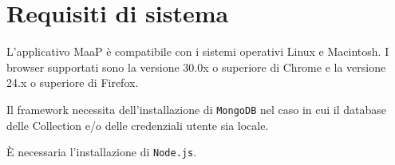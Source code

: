 \section{Requisiti di sistema}

L'applicativo MaaP è compatibile con i sistemi operativi Linux e Macintosh.
I browser supportati sono la versione 30.0x o superiore di Chrome e la versione 24.x o superiore di Firefox.

Il framework necessita dell'installazione di \texttt{MongoDB} nel caso in cui il database delle Collection e/o delle credenziali utente sia locale.

È necessaria l'installazione di \texttt{Node.js}.





